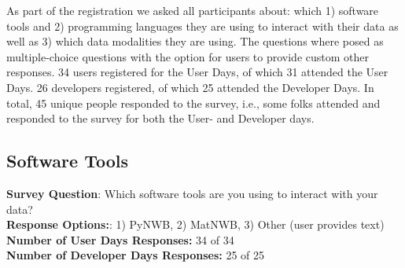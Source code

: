 \documentclass{article}
\begin{document}
As part of the registration we asked all participants about: which 1) software tools and 2) programming languages they are using to interact with their data as well as 3) which data modalities they are using. The questions where posed as multiple-choice questions with the option for users to provide custom other responses. 34 users registered for the User Days, of which 31 attended the User Days. 26 developers registered, of which 25 attended the Developer Days. In total, 45 unique people responded to the survey, i.e., some folks attended and responded to the survey for both the User- and Developer days. 

\vspace{-0.2cm}
\subsection{Software Tools}

{\setlength{\parindent}{0cm}
\textbf{Survey Question}: Which software tools are you using to interact with your data? \\
\textbf{Response Options:}: 1) PyNWB, 2) MatNWB, 3) Other (user provides text) \\
\textbf{Number of User Days Responses:} 34 of 34 \\ 
\textbf{Number of Developer Days Responses:} 25 of 25 
}
\end{document}
